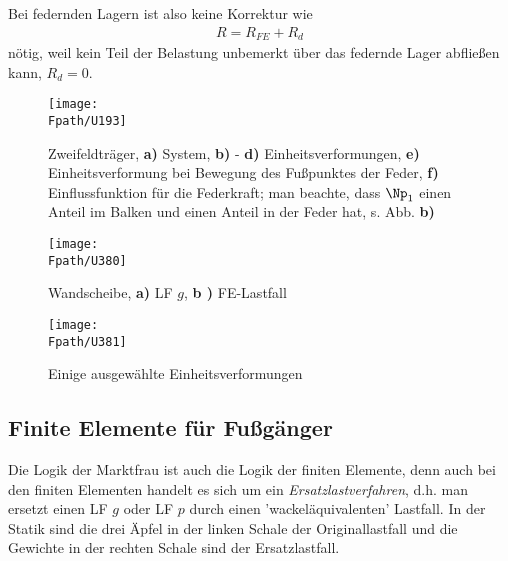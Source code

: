 {{\begin{remark}
Bei federnden Lagern ist also keine Korrektur wie
\begin{align}
R =  R_{FE} + R_d
\end{align}
n\"{o}tig, weil kein Teil der Belastung unbemerkt \"{u}ber das federnde Lager abflie{\ss}en kann, $R_d = 0$.
\end{remark}

\begin{figure}[tbp]
\centering
\texttt{[image: \\Fpath/U193]}
\caption{Zweifeldtr\"{a}ger, \textbf{ a)} System, \textbf{ b)} - \textbf{ d)} Einheitsverformungen, \textbf{ e)} Einheitsverformung bei Bewegung des Fu{\ss}punktes der Feder,  \textbf{f)} Einflussfunktion f\"{u}r die Federkraft; man beachte, dass $\Np_1$ einen Anteil im Balken und einen Anteil in der Feder hat, s. Abb. \textbf{ b)}} \label{U193}
\end{figure}%

\begin{figure}[tbp]
\centering
\if {} \sidecaption \fi
\texttt{[image: \\Fpath/U380]}
\caption{Wandscheibe, \textbf{ a)} LF $g$, \textbf{b )} FE-Lastfall}
\label{U380}%
\end{figure}%
\begin{figure}[tbp]
\centering
\if {} \sidecaption \fi
\texttt{[image: \\Fpath/U381]}
\caption{Einige ausgew\"{a}hlte Einheitsverformungen}
\label{U381}%
\end{figure}%

\textcolor{blau2}{\section{Finite Elemente f\"{u}r Fu{\ss}g\"{a}nger}}
Die Logik der Marktfrau ist auch die Logik der finiten Elemente, denn auch bei den finiten Elementen handelt es sich um ein {\em Ersatzlastverfahren\/}, d.h. man ersetzt einen LF $g$ oder LF $p$ durch einen 'wackel\"{a}quivalenten' Lastfall. In der Statik sind die drei \"{A}pfel in der linken Schale der Originallastfall und die Gewichte in der rechten Schale sind der Ersatzlastfall.

}}
